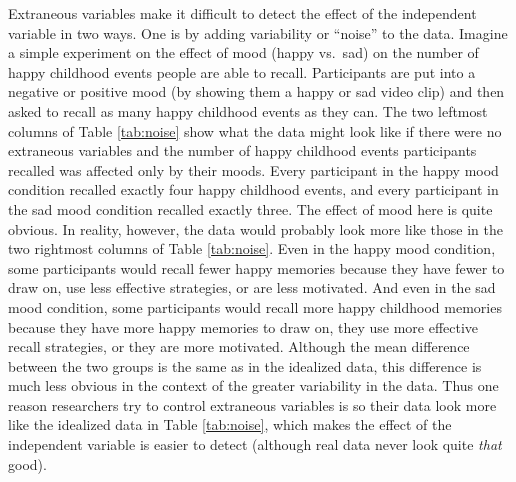\documentclass[
]{krantz}
\begin{document}
Extraneous variables make it difficult to detect the effect of the independent variable in two ways. One is by adding variability or ``noise'' to the data. Imagine a simple experiment on the effect of mood (happy vs.~sad) on the number of happy childhood events people are able to recall. Participants are put into a negative or positive mood (by showing them a happy or sad video clip) and then asked to recall as many happy childhood events as they can. The two leftmost columns of Table \ref{tab:noise} show what the data might look like if there were no extraneous variables and the number of happy childhood events participants recalled was affected only by their moods. Every participant in the happy mood condition recalled exactly four happy childhood events, and every participant in the sad mood condition recalled exactly three. The effect of mood here is quite obvious. In reality, however, the data would probably look more like those in the two rightmost columns of Table \ref{tab:noise}. Even in the happy mood condition, some participants would recall fewer happy memories because they have fewer to draw on, use less effective strategies, or are less motivated. And even in the sad mood condition, some participants would recall more happy childhood memories because they have more happy memories to draw on, they use more effective recall strategies, or they are more motivated. Although the mean difference between the two groups is the same as in the idealized data, this difference is much less obvious in the context of the greater variability in the data. Thus one reason researchers try to control extraneous variables is so their data look more like the idealized data in Table \ref{tab:noise}, which makes the effect of the independent variable is easier to detect (although real data never look quite \emph{that} good).
\end{document}
